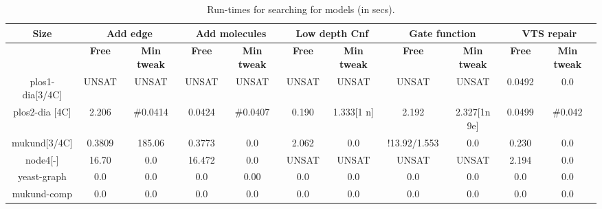 
\begin{table}[t]
  \centering
  \begin{tabular}[t]{|c|c|c|c|c|c|c|c|c|c|c}\hline
    {\multirow{2}{*} \textbf{Size}}  & \multicolumn{2}{c|}{\textbf{Add edge}} & \multicolumn{2}{c|}{\textbf{Add molecules}} & \multicolumn{2}{c|}{\textbf{Low depth Cnf}}  &  \multicolumn{2}{c|}{\textbf{Gate function}} &  \multicolumn{2}{c|}{\textbf{VTS repair}} \\\hline
   
   \cline{2-9}
    {} & {\textbf{Free}} & {\textbf{Min tweak}} & {\textbf{Free}} & {\textbf{Min tweak}} & {\textbf{Free}} & {\textbf{Min tweak}} & {\textbf{Free}} & {\textbf{Min tweak}} & {\textbf{Free}} & {\textbf{Min tweak}} \\\hline
    
    plos1-dia[3/4C] & UNSAT & UNSAT & UNSAT & UNSAT & UNSAT & UNSAT & UNSAT & UNSAT & 0.0492 & 0.0\\\hline
    plos2-dia [4C] & 2.206 & \#0.0414 & 0.0424 & \#0.0407 & 0.190 & 1.333[1 n] & 2.192 & 2.327[1n 9e] & 0.0499 & \#0.042 \\\hline
    mukund[3/4C] & 0.3809 & 185.06 & 0.3773 & 0.0 & 2.062 & 0.0 & !13.92/1.553 & 0.0 & 0.230 & 0.0 \\\hline
    node4[-] & 16.70 & 0.0 & 16.472 & 0.0 & UNSAT & UNSAT & UNSAT & UNSAT & 2.194 & 0.0\\\hline
    yeast-graph & 0.0 & 0.0 & 0.0 & 0.00 & 0.0 & 0.0 & 0.0  & 0.0 & 0.0 & 0.0 \\\hline
    mukund-comp & 0.0 & 0.0 & 0.0 & 0.0 & 0.0 & 0.0 & 0.0 & 0.0 & 0.0 & 0.0\\\hline
  \end{tabular}
  \caption{Run-times for searching for models (in secs).}
  \label{tab:qf-grabh}
\end{table}

